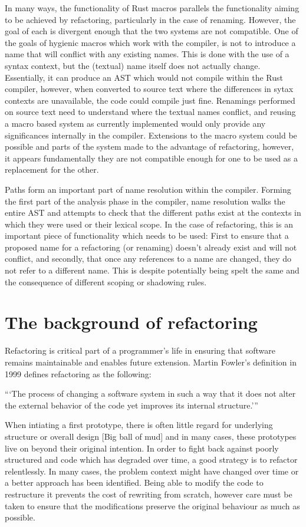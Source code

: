 In many ways, the functionality of Rust macros parallels the functionality aiming to be achieved by refactoring, particularly in the case of renaming. However, the goal of each is divergent enough that the two systems are not compatible. One of the goals of hygienic macros which work with the compiler, is not to introduce a name that will conflict with any existing names. This is done with the use of a syntax context, but the (textual) name itself does not actually change. Essentially, it can produce an AST which would not compile within the Rust compiler, however, when converted to source text where the differences in sytax contexts are unavailable, the code could compile just fine. Renamings performed on source text need to understand where the textual names conflict, and reusing a macro based system as currently implemented would only provide any significances internally in the compiler. Extensions to the macro system could be possible and parts of the system made to the advantage of refactoring, however, it appears fundamentally they are not compatible enough for one to be used as a replacement for the other.

Paths form an important part of name resolution within the compiler. Forming the first part of the analysis phase in the compiler, name resolution walks the entire AST and attempts to check that the different paths exist at the contexts in which they were used or their lexical scope. In the case of refactoring, this is an important piece of functionality which needs to be used: First to ensure that a proposed name for a refactoring (or renaming) doesn't already exist and will not conflict, and secondly, that once any references to a name are changed, they do not refer to a different name. This is despite potentially being spelt the same and the consequence of different scoping or shadowing rules.

\section{The background of refactoring}\label{S:refactorback}
Refactoring is critical part of a programmer's life in ensuring that software remains maintainable and enables future extension. Martin Fowler's definition in 1999 defines refactoring as the following:

```The process of changing a software system in such a way that it does not
alter the external behavior of the code yet improves its internal structure.'''

When intiating a first prototype, there is often little regard for underlying structure or overall design [Big ball of mud] and in many cases, these prototypes live on beyond their original intention. In order to fight back against poorly structured and code which has degraded over time, a good strategy is to refactor relentlessly. In many cases, the problem context might have changed over time or a better approach has been identified. Being able to modify the code to restructure it prevents the cost of rewriting from scratch, however care must be taken to ensure that the modifications preserve the original behaviour as much as possible.

